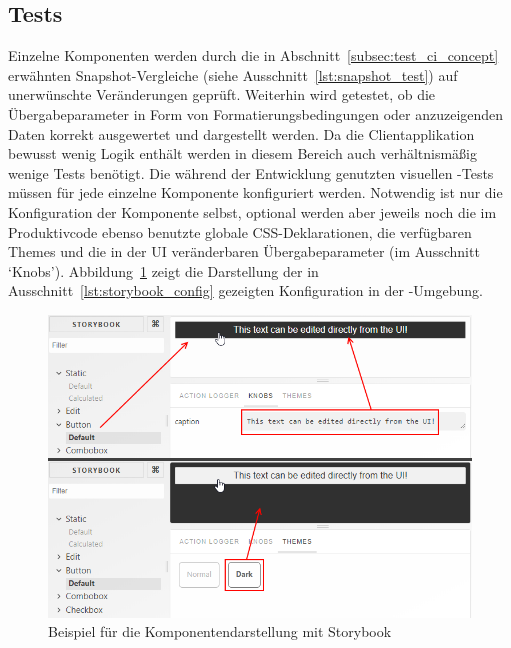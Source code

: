 \subsection{Tests}
Einzelne Komponenten werden durch die in Abschnitt~\ref{subsec:test_ci_concept} erwähnten Snapshot-Vergleiche (siehe Ausschnitt~\ref{lst:snapshot_test}) auf unerwünschte Veränderungen geprüft. Weiterhin wird getestet, ob die Übergabeparameter in Form von Formatierungsbedingungen oder anzuzeigenden Daten korrekt ausgewertet und dargestellt werden. Da die Clientapplikation bewusst wenig Logik enthält werden in diesem Bereich auch verhältnismäßig wenige Tests benötigt.
Die während der Entwicklung genutzten visuellen -Tests müssen für jede einzelne Komponente konfiguriert werden. Notwendig ist nur die Konfiguration der Komponente selbst, optional werden aber jeweils noch die im Produktivcode ebenso benutzte globale CSS-Deklarationen, die verfügbaren Themes und die in der UI veränderbaren Übergabeparameter (im Ausschnitt `Knobs'). Abbildung~\ref{fig:storybook_example} zeigt die Darstellung der in Ausschnitt~\ref{lst:storybook_config} gezeigten Konfiguration in der -Umgebung.



\begin{figure}
    \centering
    \captionsetup{justification=centering}
    \includegraphics[width=\textwidth]{figures/storybook_example.png}
        \caption{Beispiel für die Komponentendarstellung mit Storybook}\label{fig:storybook_example}
\end{figure}

